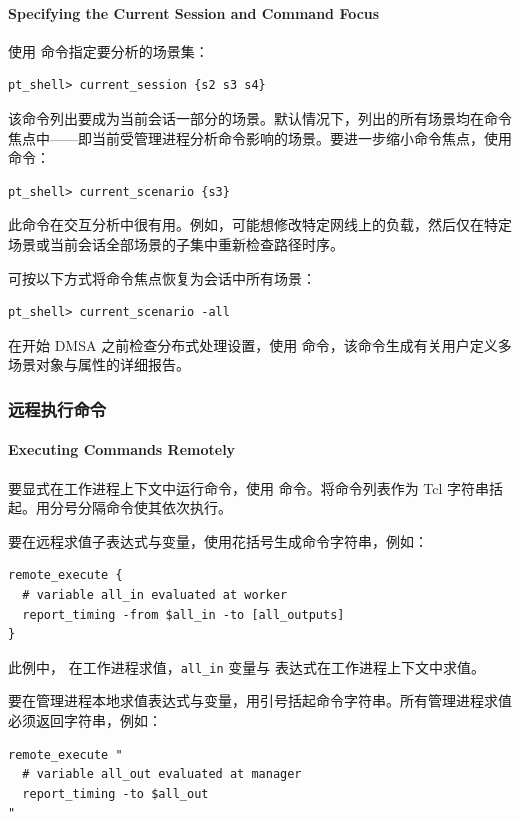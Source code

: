 \paragraph*{Specifying the Current Session and Command Focus}

使用  命令指定要分析的场景集：
\begin{lstlisting}
pt_shell> current_session {s2 s3 s4}
\end{lstlisting}

该命令列出要成为当前会话一部分的场景。默认情况下，列出的所有场景均在命令焦点中——即当前受管理进程分析命令影响的场景。要进一步缩小命令焦点，使用  命令：
\begin{lstlisting}
pt_shell> current_scenario {s3}
\end{lstlisting}

此命令在交互分析中很有用。例如，可能想修改特定网线上的负载，然后仅在特定场景或当前会话全部场景的子集中重新检查路径时序。

可按以下方式将命令焦点恢复为会话中所有场景：
\begin{lstlisting}
pt_shell> current_scenario -all
\end{lstlisting}

在开始 DMSA 之前检查分布式处理设置，使用  命令，该命令生成有关用户定义多场景对象与属性的详细报告。

\subsubsection{远程执行命令}
\paragraph*{Executing Commands Remotely}

要显式在工作进程上下文中运行命令，使用  命令。将命令列表作为 Tcl 字符串括起。用分号分隔命令使其依次执行。

要在远程求值子表达式与变量，使用花括号生成命令字符串，例如：
\begin{lstlisting}
remote_execute {
  # variable all_in evaluated at worker
  report_timing -from $all_in -to [all_outputs]
}
\end{lstlisting}
此例中， 在工作进程求值，\texttt{all\_in} 变量与  表达式在工作进程上下文中求值。

要在管理进程本地求值表达式与变量，用引号括起命令字符串。所有管理进程求值必须返回字符串，例如：
\begin{lstlisting}
remote_execute "
  # variable all_out evaluated at manager
  report_timing -to $all_out
"
\end{lstlisting}


